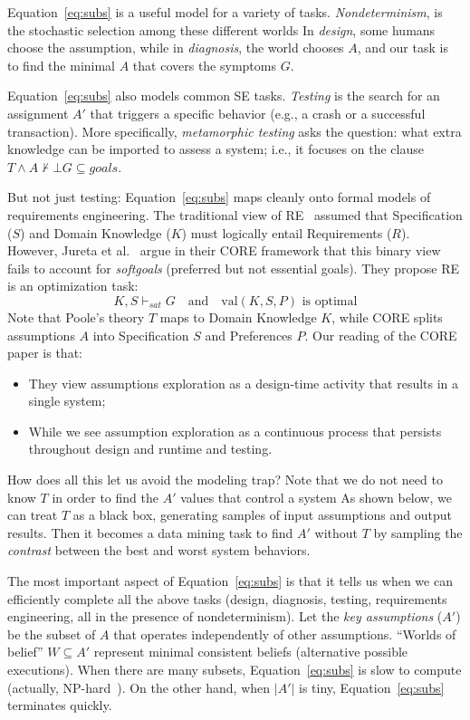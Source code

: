 \documentclass[pdflatex,sn-basic]{sn-jnl}
\begin{document}
Equation~\ref{eq:subs} is a useful model for a variety of tasks. {\em Nondeterminism}, is  the stochastic
selection among these different worlds
 In  {\em design}, some humans choose the assumption, while
 in {\em diagnosis}, the world chooses $A$, and our task is to find the minimal $A$ that covers the symptoms $G$. 

Equation~\ref{eq:subs} also models common SE tasks.
 {\em Testing} is  the search for an assignment $A'$ that triggers a specific behavior (e.g., a crash or a successful transaction).  More specifically, {\em metamorphic testing}  asks the question: what extra knowledge can be imported to assess a system; i.e., it focuses on the clause
$T \wedge A  \not\vdash \bot 
 G \subseteq \mathit{goals}$.
 
But not just testing: Equation~\ref{eq:subs} maps cleanly onto formal models of 
requirements engineering.
The traditional view of
RE~\citep{Zave1997} assumed that Specification ($S$) and Domain Knowledge
($K$) must logically entail Requirements ($R$). However, Jureta et
al.~\citep{Jureta2008} argue in their CORE framework that this binary
view fails to account for \textit{softgoals} (preferred but not
essential goals). They propose RE is an optimization task:
\begin{equation}\label{core}
K, S \vdash_{sat} G \quad \text{and} \quad \text{val}(K, S, P)
\text{ is optimal}
\end{equation}
Note that Poole's  theory $T$ maps to Domain Knowledge $K$,
while CORE splits assumptions $A$ into Specification $S$ and
Preferences $P$. 
Our reading of the CORE
paper is that:
\begin{itemize}
\item
They view  assumptions exploration as a  design-time activity that results in a single system;
\item
While we see assumption exploration as   a continuous process that persists throughout design and runtime and testing.
\end{itemize}
How does all  this let us avoid
the modeling trap?
Note that we do not need to know $T$ in order to find the $A'$ values that control a system
As shown below,  we can treat $T$ as a black box, generating
samples of input assumptions and output results. Then it becomes a data mining task
to  find $A'$ without $T$ by  sampling the
\textit{contrast} between the best and worst system behaviors.


The most important aspect of 
Equation~\ref{eq:subs} is that it tells
us when we can efficiently complete all the above tasks (design, diagnosis, testing, requirements engineering, all in the presence of nondeterminism).
Let the \textit{key assumptions} ($A'$) be the subset of $A$ that
operates independently of other assumptions. ``Worlds of belief'' $W
\subseteq A'$ represent minimal consistent beliefs (alternative
possible executions).   
When there are many subsets, 
Equation~\ref{eq:subs} is slow to compute
(actually, NP-hard~\citep{Bylander1991}). On the other hand, when $|A'|$ is tiny,
Equation~\ref{eq:subs} terminates quickly.
\end{document}
